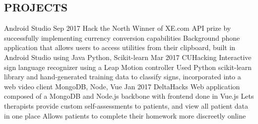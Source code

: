 \documentclass{aanguyen_res}
\begin{document}
\begin{main}
    \section{PROJECTS}
      \begin{entrylist}
        \rightentry%
          {Android Studio}%
          {\href{https://github.com/kumailn/clipBuddy}{}}%
          {Sep 2017}%
          {Hack the North}%
          {\createlist%
            {%
              Winner of XE.com API prize by successfully implementing currency conversion %
              capabilities %
            }%
            {%
               Background phone application that allows users to access utilities from their clipboard, %
               built in Android Studio using Java%
            }%
          }
        \rightentry%
          {Python, Scikit-learn}%
          {\href{https://github.com/aanguyen/SignBuddy}{}}%
          {Mar 2017}%
          {CUHacking}%
          {\createlist%
            {%
              Interactive sign language recognizer using a Leap Motion controller %
            }%
            {%
              Used Python scikit-learn library and hand-generated training data to classify signs, %
              incorporated into a web video client %
            }%
          }
        \rightentry%
          {MongoDB, Node, Vue}%
          {\href{https://github.com/dtong1113/TherapyHelper}{}}%
          {Jan 2017}%
          {DeltaHacks}%
          {\createlist%
            {%
              Web application composed of a MongoDB and Node.js backbone with frontend done in %
              Vue.js %
            }%
            {%
              Lets therapists provide custom self-assessments to patients, and view all patient data in %
              one place %
            }%
            {%
              Allows patients to complete their homework more discreetly online %
            }%
          }
      \end{entrylist}
  \end{main}
\end{document}

